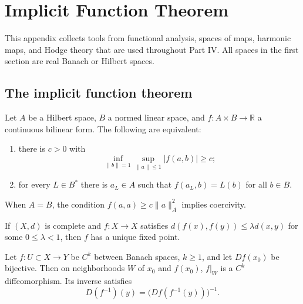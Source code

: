 \chapter{Implicit Function Theorem}
\label{app:chow-iv-appendix-k}

This appendix collects tools from functional analysis, spaces of maps,
harmonic maps, and Hodge theory that are used throughout Part IV.  All spaces
in the first section are real Banach or Hilbert spaces.

\section{The implicit function theorem}

\begin{theorem}
\label{thm:chow-iv-k1-lax-milgram-lions}
Let $A$ be a Hilbert space, $B$ a normed linear space, and
$f:A\times B\to\mathbb R$ a continuous bilinear form.  The following are
equivalent:
\begin{enumerate}
\item there is $c>0$ with
\[
\inf_{\|b\|=1}\sup_{\|a\|\le1}|f(a,b)|\ge c;
\]
\item for every $L\in B^*$ there is $a_L\in A$ such that
$f(a_L,b)=L(b)$ for all $b\in B$.
\end{enumerate}
When $A=B$, the condition $f(a,a)\ge c\|a\|_A^2$ implies coercivity.
\end{theorem}

\begin{lemma}
\label{lem:chow-iv-k2-contraction}
If $(X,d)$ is complete and $f:X\to X$ satisfies
$d(f(x),f(y))\le\lambda d(x,y)$ for some $0\le\lambda<1$, then $f$ has a
unique fixed point.
\end{lemma}

\begin{theorem}
\label{thm:chow-iv-k3-banach-inverse-function}
Let $f:U\subset X\to Y$ be $C^k$ between Banach spaces, $k\ge1$, and let
$Df(x_0)$ be bijective.  Then on neighborhoods $W$ of $x_0$ and $f(x_0)$,
$f|_W$ is a $C^k$ diffeomorphism.  Its inverse satisfies
\[
D(f^{-1})(y)=\bigl(Df(f^{-1}(y))\bigr)^{-1}.
\]
\end{theorem}

